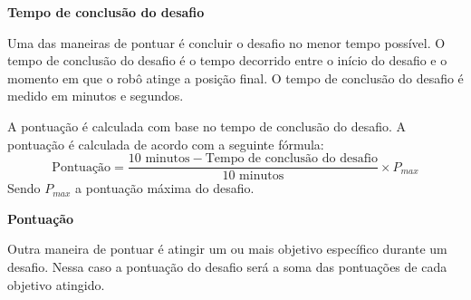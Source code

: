 \clearpage
\sffamily
{\bfseries\color[rgb]{0.4,0.4,0.4}{Regra 8 – O Método de Pontuação} }
{}

\bigskip

{\bfseries Tempo de conclusão do desafio}

\headlinebox

Uma das maneiras de pontuar é concluir o desafio no menor tempo possível. O tempo de conclusão do desafio é o tempo decorrido entre o início do desafio e o momento em que o robô atinge a posição final. O tempo de conclusão do desafio é medido em minutos e segundos.

A pontuação é calculada com base no tempo de conclusão do desafio. A pontuação é calculada de acordo com a seguinte fórmula:
$$
\text{Pontuação} = \frac{10 \text{ minutos} - \text{Tempo de conclusão do desafio}}{10 \text{ minutos}} \times P_{max}
$$
Sendo $P_{max}$ a pontuação máxima do desafio.

\bigskip

{\bfseries Pontuação}

\headlinebox

Outra maneira de pontuar é atingir um ou mais objetivo específico durante um desafio. Nessa caso a pontuação do desafio será a soma das pontuações de cada objetivo atingido.